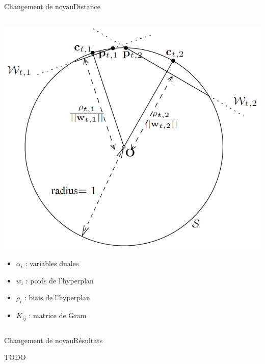 \begin{frame}{Changement de noyau}{Distance}
\begin{columns}
\begin{column}{.47\textwidth}
\includegraphics[width=\textwidth]{images/svm}


\begin{itemize}
\item $\alpha_i$ : variables duales
\item $w_i$ : poids de l'hyperplan
\item $\rho_i$ : biais de l'hyperplan
\item $K_{ij}$ : matrice de Gram
\end{itemize}

\end{column}
\end{columns}

\end{frame}

\begin{frame}{Changement de noyau}{Résultats}

\begin{center}
{\Huge  TODO}
\end{center}

\end{frame}
